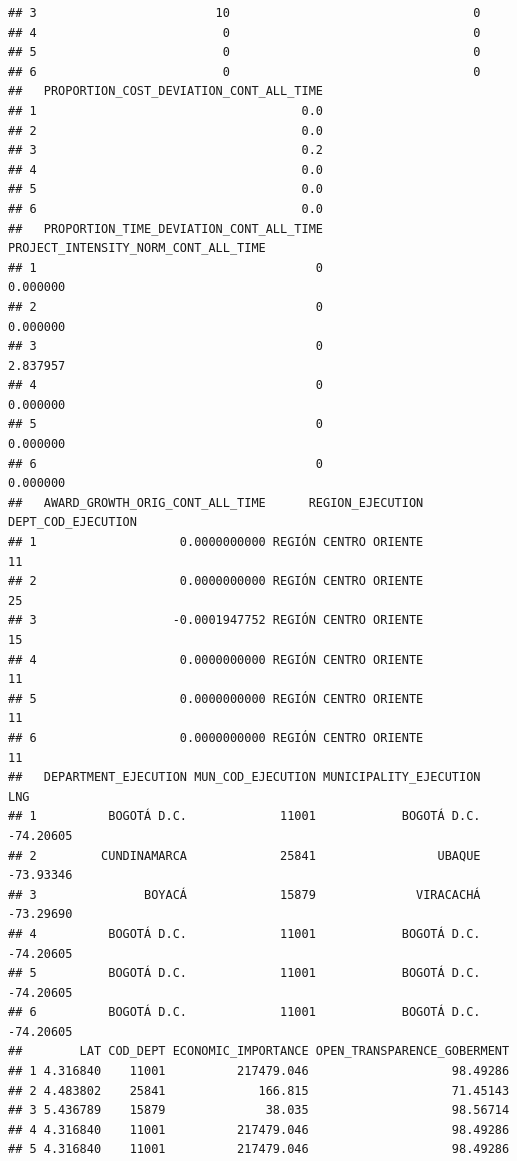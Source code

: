 \documentclass[
]{article}
\begin{document}
\begin{verbatim}
## 3                         10                                  0
## 4                          0                                  0
## 5                          0                                  0
## 6                          0                                  0
##   PROPORTION_COST_DEVIATION_CONT_ALL_TIME
## 1                                     0.0
## 2                                     0.0
## 3                                     0.2
## 4                                     0.0
## 5                                     0.0
## 6                                     0.0
##   PROPORTION_TIME_DEVIATION_CONT_ALL_TIME PROJECT_INTENSITY_NORM_CONT_ALL_TIME
## 1                                       0                             0.000000
## 2                                       0                             0.000000
## 3                                       0                             2.837957
## 4                                       0                             0.000000
## 5                                       0                             0.000000
## 6                                       0                             0.000000
##   AWARD_GROWTH_ORIG_CONT_ALL_TIME      REGION_EJECUTION DEPT_COD_EJECUTION
## 1                    0.0000000000 REGIÓN CENTRO ORIENTE                 11
## 2                    0.0000000000 REGIÓN CENTRO ORIENTE                 25
## 3                   -0.0001947752 REGIÓN CENTRO ORIENTE                 15
## 4                    0.0000000000 REGIÓN CENTRO ORIENTE                 11
## 5                    0.0000000000 REGIÓN CENTRO ORIENTE                 11
## 6                    0.0000000000 REGIÓN CENTRO ORIENTE                 11
##   DEPARTMENT_EJECUTION MUN_COD_EJECUTION MUNICIPALITY_EJECUTION       LNG
## 1          BOGOTÁ D.C.             11001            BOGOTÁ D.C. -74.20605
## 2         CUNDINAMARCA             25841                 UBAQUE -73.93346
## 3               BOYACÁ             15879              VIRACACHÁ -73.29690
## 4          BOGOTÁ D.C.             11001            BOGOTÁ D.C. -74.20605
## 5          BOGOTÁ D.C.             11001            BOGOTÁ D.C. -74.20605
## 6          BOGOTÁ D.C.             11001            BOGOTÁ D.C. -74.20605
##        LAT COD_DEPT ECONOMIC_IMPORTANCE OPEN_TRANSPARENCE_GOBERMENT
## 1 4.316840    11001          217479.046                    98.49286
## 2 4.483802    25841             166.815                    71.45143
## 3 5.436789    15879              38.035                    98.56714
## 4 4.316840    11001          217479.046                    98.49286
## 5 4.316840    11001          217479.046                    98.49286

\end{verbatim}
\end{document}
